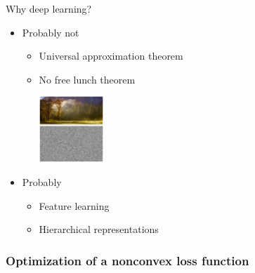 \documentclass{beamer}
\begin{document}
\begin{frame}{Why deep learning?}
  \begin{itemize}
    \item Probably not
      \begin{itemize}
        \item Universal approximation theorem
        \item No free lunch theorem

          {\includegraphics[width=0.2\textwidth]{nfl.png}}
      \end{itemize}
    \item Probably
      \begin{itemize}
        \item Feature learning
        \item Hierarchical representations
      \end{itemize}
  \end{itemize}
\end{frame}



\begin{frame}
  \frametitle{Optimization of a nonconvex loss function}
\end{frame}
\end{document}
